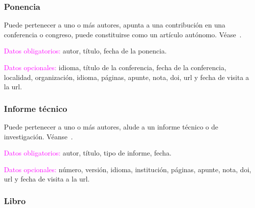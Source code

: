 \documentclass{book}
\begin{document}
{{{{{{{{{{{{{{{{{\subsubsection{Ponencia}

Puede pertenecer a uno o más autores, apunta a una contribución en una conferencia o congreso, puede constituirse como un artículo autónomo. Véase~\textcite{Addiechi2011}.

\begin{compactdesc}
\item [\textcolor{magenta}{Datos obligatorios:}] autor, título, fecha de la ponencia.
\item [\textcolor{magenta}{Datos opcionales:}] idioma, título de la conferencia, fecha de la conferencia, localidad, organización, idioma, páginas, apunte, nota, doi, url y fecha de visita a la url.
\end{compactdesc}

\begin{mdframed}[linewidth=.5pt,linecolor=black!30,roundcorner=3pt,backgroundcolor=yellow!15]
\printbibliography[keyword=proceedings,heading=none]
\end{mdframed}

\subsubsection{Informe técnico}

Puede pertenecer a uno o más autores, alude a un informe técnico o de investigación. Véanse~\textcite{infopad,infochiu}.

\begin{compactdesc}
\item [\textcolor{magenta}{Datos obligatorios:}] autor, título, tipo de informe, fecha.
\item [\textcolor{magenta}{Datos opcionales:}] número, versión, idioma, institución, páginas, apunte, nota, doi, url y fecha de visita a la url.
\end{compactdesc}

\begin{mdframed}[linewidth=.5pt,linecolor=black!30,roundcorner=3pt,backgroundcolor=yellow!15]
\noindent\vspace{-12pt}
\printbibliography[keyword=infotecnico,heading=none]
\end{mdframed}

\subsubsection{Libro}

}}}}}}}}}}}}}}}}}
\end{document}
